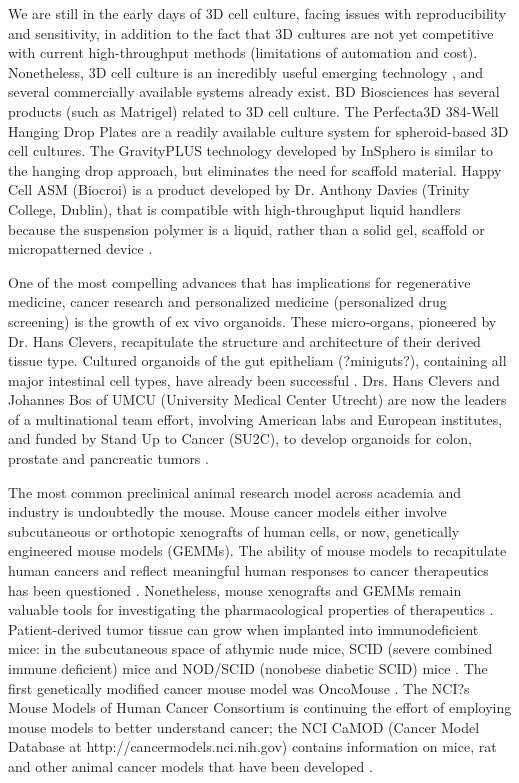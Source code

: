 \documentclass[12pt]{article}
\begin{document}
We are still in the early days of 3D cell culture, facing issues with reproducibility and sensitivity, in addition to the fact that 3D cultures are not yet competitive with current high-throughput methods (limitations of automation and cost). Nonetheless, 3D cell culture is an incredibly useful emerging technology \cite{Kunz-Schughart2004}, and several commercially available systems already exist. BD Biosciences has several products (such as Matrigel) related to 3D cell culture. The Perfecta3D 384-Well Hanging Drop Plates are a readily available culture system for spheroid-based 3D cell cultures. The GravityPLUS technology developed by InSphero is similar to the hanging drop approach, but eliminates the need for scaffold material. Happy Cell\textregistered\: ASM (Biocroi) is a product developed by Dr. Anthony Davies (Trinity College, Dublin), that is compatible with high-throughput liquid handlers because the suspension polymer is a liquid, rather than a solid gel, scaffold or micropatterned device \cite{Glaser2013}.
	
One of the most compelling advances that has implications for regenerative medicine, cancer research and personalized medicine (personalized drug screening) is the growth of ex vivo organoids. These micro-organs, pioneered by Dr. Hans Clevers, recapitulate the structure and architecture of their derived tissue type. Cultured organoids of the gut epitheliam (?miniguts?), containing all major intestinal cell types, have already been successful \cite{Sato2009,Schwank2013}. Drs. Hans Clevers and Johannes Bos of UMCU (University Medical Center Utrecht) are now the leaders of a multinational team effort, involving American labs and European institutes, and funded by Stand Up to Cancer (SU2C), to develop organoids for colon, prostate and pancreatic tumors \cite{Krol2013}.
	
The most common preclinical animal research model across academia and industry is undoubtedly the mouse. Mouse cancer models either involve subcutaneous or orthotopic xenografts of human cells, or now, genetically engineered mouse models (GEMMs). The ability of mouse models to recapitulate human cancers and reflect meaningful human responses to cancer therapeutics has been questioned \cite{Worp2010,Hutchinson2011}. Nonetheless, mouse xenografts and GEMMs remain valuable tools for investigating the pharmacological properties of therapeutics \cite{Sharma2010}. Patient-derived tumor tissue can grow when implanted into immunodeficient mice: in the subcutaneous space of athymic nude mice, SCID (severe combined immune deficient) mice and NOD/SCID (nonobese diabetic SCID) mice \cite{Jin2010}. The first genetically modified cancer mouse model was OncoMouse \cite{Mukherjee2010}. The NCI?s Mouse Models of Human Cancer Consortium is continuing the effort of employing mouse models to better understand cancer; the NCI CaMOD (Cancer Model Database at http://cancermodels.nci.nih.gov) contains information on mice, rat and other animal cancer models that have been developed \cite{Hanahan2007}.
\end{document}
